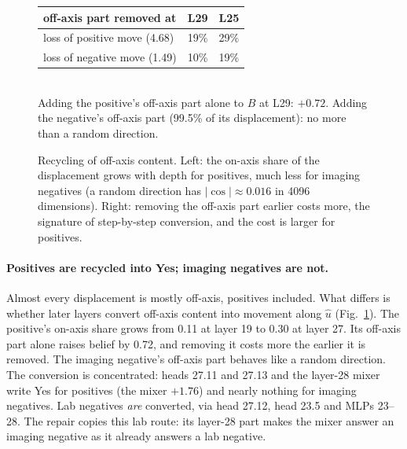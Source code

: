 \documentclass[10pt]{article}
\newcommand{\uhat}{\hat{u}}
\begin{document}
\begin{figure}[t]
\centering
{}\hfill
\begin{minipage}[b]{0.5\linewidth}\small
\begin{tabular}{@{}lcc@{}}
\toprule
off-axis part removed at & L29 & L25 \\
\midrule
loss of positive move (4.68) & 19\% & 29\% \\
loss of negative move (1.49) & 10\% & 19\% \\
\bottomrule
\end{tabular}\\[6pt]
Adding the positive's off-axis part alone to $B$ at L29: $+0.72$. Adding the negative's off-axis part (99.5\% of its displacement): no more than a random direction.
\end{minipage}
\caption{Recycling of off-axis content. Left: the on-axis share of the displacement grows with depth for positives, much less for imaging negatives (a random direction has $|\cos| \approx 0.016$ in 4096 dimensions). Right: removing the off-axis part earlier costs more, the signature of step-by-step conversion, and the cost is larger for positives.}
\label{fig:recycle}
\end{figure}

\paragraph{Positives are recycled into Yes; imaging negatives are not.} Almost every displacement is mostly off-axis, positives included. What differs is whether later layers convert off-axis content into movement along $\uhat$ (Fig.~\ref{fig:recycle}). The positive's on-axis share grows from 0.11 at layer 19 to 0.30 at layer 27. Its off-axis part alone raises belief by 0.72, and removing it costs more the earlier it is removed. The imaging negative's off-axis part behaves like a random direction. The conversion is concentrated: heads 27.11 and 27.13 and the layer-28 mixer write Yes for positives (the mixer $+1.76$) and nearly nothing for imaging negatives. Lab negatives \emph{are} converted, via head 27.12, head 23.5 and MLPs 23--28. The repair copies this lab route: its layer-28 part makes the mixer answer an imaging negative as it already answers a lab negative.
\end{document}
